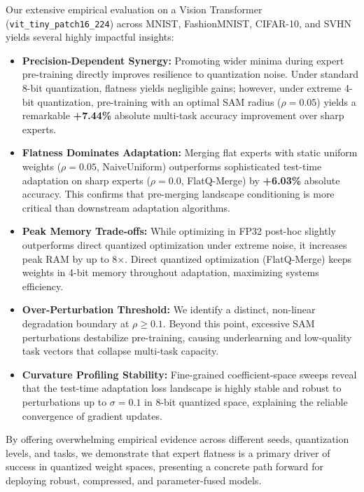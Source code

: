 Our extensive empirical evaluation on a Vision Transformer (\texttt{vit\_tiny\_patch16\_224}) \cite{Dosovitskiy2020ViT} across MNIST, FashionMNIST, CIFAR-10, and SVHN yields several highly impactful insights:
\begin{itemize}
  \item \textbf{Precision-Dependent Synergy:} Promoting wider minima during expert pre-training directly improves resilience to quantization noise. Under standard 8-bit quantization, flatness yields negligible gains; however, under extreme 4-bit quantization, pre-training with an optimal SAM radius ($\rho=0.05$) yields a remarkable \textbf{+7.44\%} absolute multi-task accuracy improvement over sharp experts.
  \item \textbf{Flatness Dominates Adaptation:} Merging flat experts with static uniform weights ($\rho=0.05$, NaiveUniform) outperforms sophisticated test-time adaptation on sharp experts ($\rho=0.0$, FlatQ-Merge) by \textbf{+6.03\%} absolute accuracy. This confirms that pre-merging landscape conditioning is more critical than downstream adaptation algorithms.
  \item \textbf{Peak Memory Trade-offs:} While optimizing in FP32 post-hoc slightly outperforms direct quantized optimization under extreme noise, it increases peak RAM by up to 8$\times$. Direct quantized optimization (FlatQ-Merge) keeps weights in 4-bit memory throughout adaptation, maximizing systems efficiency.
  \item \textbf{Over-Perturbation Threshold:} We identify a distinct, non-linear degradation boundary at $\rho \ge 0.1$. Beyond this point, excessive SAM perturbations destabilize pre-training, causing underlearning and low-quality task vectors that collapse multi-task capacity.
  \item \textbf{Curvature Profiling Stability:} Fine-grained coefficient-space sweeps reveal that the test-time adaptation loss landscape is highly stable and robust to perturbations up to $\sigma=0.1$ in 8-bit quantized space, explaining the reliable convergence of gradient updates.
\end{itemize}

By offering overwhelming empirical evidence across different seeds, quantization levels, and tasks, we demonstrate that expert flatness is a primary driver of success in quantized weight spaces, presenting a concrete path forward for deploying robust, compressed, and parameter-fused models.

